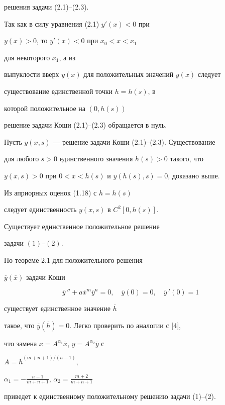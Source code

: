\begin{pf}
решения задачи (2.1)--(2.3).


Так как в силу уравнения (2.1) $ y'(x) < 0 $ при


$ y(x) > 0 $, то $ y'(x) < 0 $ при $ x_0 < x < x_1 $ 


для некоторого $ x_1 $, а из 


выпуклости вверх $ y(x) $ для положительных значений $ y(x) $ следует


существование единственной точки $ h = h(s) $, в


которой положительное на $ (0, h(s)) $ 


решение задачи Коши (2.1)--(2.3) обращается в нуль.








Пусть $ y(x, s) $ --- решение задачи Коши (2.1)--(2.3). Существование


для любого $ s > 0 $ единственного значения $ h(s) > 0 $ такого, что


$y(x,s) > 0 $ при $ 0 < x < h(s) $ и $ y(h(s), s) = 0 $, доказано выше.


Из априорных оценок (1.18) с $ h = h(s) $ 


следует единственность $ y(x,s) $ в $ C^2[0, h(s)] $.


\end{pf}





\begin{thms} Существует единственное положительное решение


задачи $(1)$--$(2)$.


\end{thms}





\begin{pf}


По теореме 2.1 для положительного решения


$ \overline y(\overline x) $ задачи Коши 


$$


\overline y\,''+a\overline x^m \overline y^n = 0,\quad


\overline y(0)=0,\quad \overline y\,'(0)=1


$$


существует единственное значение $ \overline h $ 


такое, что $ \overline y(\overline h)=0 $. Легко проверить по аналогии с [4],


что замена $ x=A^{\alpha_1}\overline x$, $y = A^{\alpha_2}\overline y $ с


$A=\overline h^{(m+n+1)/(n-1)}$, 


$\alpha_1= -\frac{n-1}{m+n+1}$, $\alpha_2= \frac{m+2}{m+n+1}$


приведет к единственному положительному решению задачи (1)--(2).


\end{pf}






